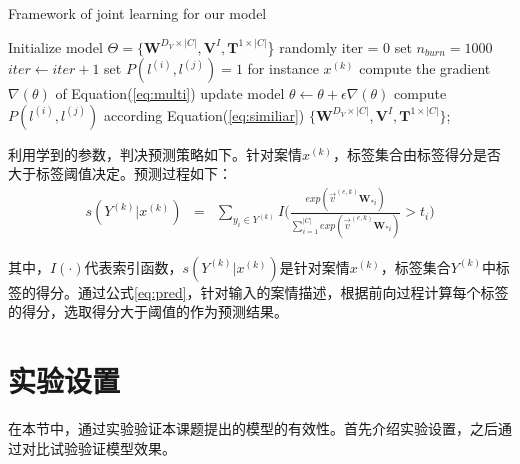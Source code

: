 \begin{algorithm}[htbp]
\caption{Framework of joint learning for our model}
\label{alg:algo}
\begin{algorithmic}[1]
\State Initialize model $\Theta=\{\textbf{W}^{D_V\times |C|},\textbf{V}^I,\textbf{T}^{1\times|C|}$\} randomly
\label{code:fram:initialize parameters}
\State iter = 0
\label{code:fram:begin}
\State set $n_{burn} = 1000$
\label{code:fram:setvalue}
\Repeat
\label{code:fram:repeat}
\State $iter \leftarrow iter+1$
\label{code:fram:re_value}
\label{code:fram:if1}
\State set $P(l^{(i)},l^{(j)}) = 1$
\label{code:fram:init1}
\label{code:fram:for1}
\State for instance $x^{(k)}$
\label{code:fram:task_join1}
\State compute the gradient $\nabla(\theta)$ of Equation(\ref{eq:multi})
\label{code:fram:com_grad}
\State update model $\theta \leftarrow \theta + \epsilon \nabla(\theta)$
\label{code:fram:update_grad}
\EndFor
\Else
\label{code:fram:else1}
\State compute $P(l^{(i)},l^{(j)})$ according Equation(\ref{eq:similiar})
\label{code:fram:com_Sim}
\EndIf
{}
\State
\Return $\{\textbf{W}^{D_V\times |C|},\textbf{V}^I,\textbf{T}^{1\times|C|}\}$;
\end{algorithmic}
\end{algorithm}

利用学到的参数，判决预测策略如下。针对案情$x^{(k)}$，标签集合由标签得分是否大于标签阈值决定。预测过程如下：
\begin{eqnarray}\label{eq:pred}
s(Y^{(k)}|x^{(k)}) &=& \sum_{y_i\in Y^{(k)}}I\Big(\frac{exp(\vec{v}^{(e,k)}\textbf{W}_{*i})}{\sum_{i=1}^{|C|}exp(\vec{v}^{(e,k)}\textbf{W}_{*i})}>t_i\Big)
\label{eq:prediction}
\end{eqnarray}

其中，$I(\cdot)$代表索引函数，$s(Y^{(k)}|x^{(k)})$是针对案情$x^{(k)}$，标签集合$Y^{(k)}$中标签的得分。通过公式\ref{eq:pred}，针对输入的案情描述，根据前向过程计算每个标签的得分，选取得分大于阈值的作为预测结果。

\section{实验设置}
\label{sec:dpam_exper}
在本节中，通过实验验证本课题提出的模型的有效性。首先介绍实验设置，之后通过对比试验验证模型效果。

